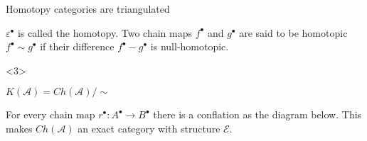 \documentclass{beamer}
\newcommand{\chain}[1]{#1^{\bullet}}
\begin{document}
\begin{frame}{Homotopy categories are triangulated}
\begin{onlyenv}
\begin{definition}[Homotopies]
                        \begin{center}
                        \end{center}
                        $\chain{\varepsilon}$ is called the homotopy. Two chain maps $\chain{f}$ and $\chain{g}$ are said to be homotopic $\chain{f}\sim\chain{g}$ if their difference $\chain{f}-\chain{g}$ is null-homotopic.
                    \end{definition}
                \end{onlyenv}
                \begin{onlyenv}<3>
                    \begin{definition}
                        $K(\mathcal{A})=Ch(\mathcal{A})/\sim$
                    \end{definition}
                    \begin{lemma}
                        For every chain map $\chain{r}:\chain{A}\rightarrow\chain{B}$ there is a conflation as the diagram below. This makes $Ch(\mathcal{A})$ an exact category with structure $\mathcal{E}$.
                        \begin{center}
                        \end{center}
                    \end{lemma}

\end{onlyenv}
\end{frame}
\end{document}
